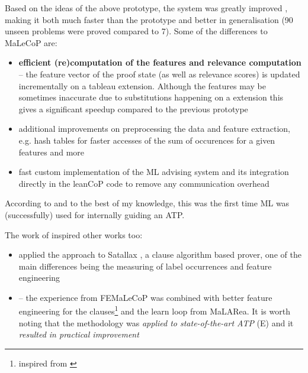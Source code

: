 \documentclass{article}
\begin{document}
Based on the ideas of the above prototype, the system was greatly improved
\citep{femalecop}, making it both much faster than the prototype and better in
generalisation (90 unseen problems were proved compared to 7). Some of the
differences to MaLeCoP are:
\begin{itemize}
    \item \textbf{efficient (re)computation of the features and relevance
        computation} -- the feature vector of the proof state (as well as
        relevance scores) is updated incrementally on a tableau extension.
        Although the features may be sometimes inaccurate due to substitutions
        happening on a extension this gives a significant speedup compared to
        the previous prototype
    \item additional improvements on preprocessing the data and feature
        extraction, e.g. hash tables for faster accesses of the sum of
        occurences for a given features and more
    \item fast custom implementation of the ML advising system and its
        integration directly in the leanCoP code to remove any communication
        overhead
\end{itemize}
According to \cite{femalecop} and to the best of my knowledge, this was
the first time ML was (successfully) used for internally guiding an ATP.

The work of \cite{femalecop} inspired other works too:
\begin{itemize}
    \item \cite{Satallax} applied the approach to Satallax
        \citep{SatallaxProver}, a clause algorithm based prover, one of the
        main differences being the measuring of label occurrences and feature
        engineering
    \item \cite{Enigma} -- the experience from FEMaLeCoP was combined with
        better feature engineering for the clauses\footnote{inspired from
        \cite{EFSF}} and the learn loop from MaLARea. It is worth noting that
        the methodology was \emph{applied to state-of-the-art ATP} (E) and
        it \emph{resulted in practical improvement}
\end{itemize}
\end{document}
